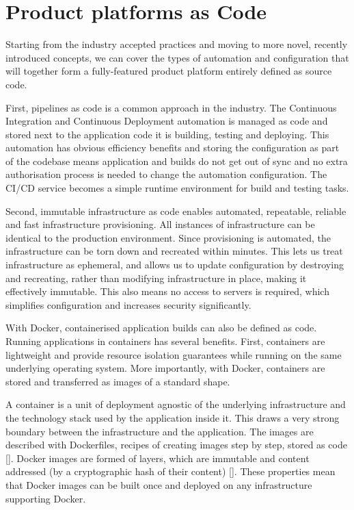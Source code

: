 \documentclass[reprint,amsmath,amssymb,aps]{revtex4-1}
\begin{document}
\section{Product platforms as Code}
\label{sec:ascode}

Starting from the industry accepted practices and moving to more novel, recently introduced concepts, we can cover the types of automation and configuration that will together form a fully-featured product platform entirely defined as source code.

First, pipelines as code is a common approach in the industry. The Continuous Integration and Continuous Deployment automation is managed as code and stored next to the application code it is building, testing and deploying. This automation has obvious efficiency benefits and storing the configuration as part of the codebase means application and builds do not get out of sync and no extra authorisation process is needed to change the automation configuration. The CI/CD service becomes a simple runtime environment for build and testing tasks.

Second, immutable infrastructure as code enables automated, repeatable, reliable and fast infrastructure provisioning. All instances of infrastructure can be identical to the production environment. Since provisioning is automated, the infrastructure can be torn down and recreated within minutes. This lets us treat infrastructure as ephemeral, and allows us to update configuration by destroying and recreating, rather than modifying infrastructure in place, making it effectively immutable. This also means no access to servers is required, which simplifies configuration and increases security significantly.

With Docker, containerised application builds can also be defined as code. Running applications in containers has several benefits. First, containers are lightweight and provide resource isolation guarantees while running on the same underlying operating system. More importantly, with Docker, containers are stored and transferred as images of a standard shape.

A container is a unit of deployment agnostic of the underlying infrastructure and the technology stack used by the application inside it. This draws a very strong boundary between the infrastructure and the application. The images are described with Dockerfiles, recipes of creating images step by step, stored as code []. Docker images are formed of layers, which are immutable and content addressed (by a cryptographic hash of their content) []. These properties mean that Docker images can be built once and deployed on any infrastructure supporting Docker.
\end{document}

